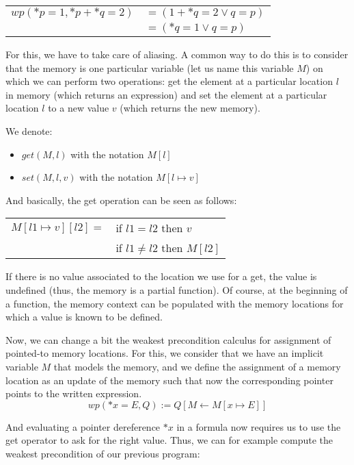 \begin{tabular}{ll}
$wp(*p = 1, *p + *q = 2)$ & $= (1 + *q = 2 \vee q = p)$\\
                          & $= (*q = 1 \vee q = p)$
\end{tabular}



For this, we have to take care of aliasing. A common way to do this is to
consider that the memory is one particular variable (let us name this variable
$M$) on which we can perform two operations: get the element at a particular
location $l$ in memory (which returns an expression) and set the element at a
particular location $l$ to a new value $v$ (which returns the new memory).


We denote:


\begin{itemize}
\item $get(M,l)$ with the notation $M[l]$
\item $set(M,l,v)$ with the notation $M[l \mapsto v]$
\end{itemize}


And basically, the get operation can be seen as follows:


\begin{tabular}{ll}
  $M[l1 \mapsto v][l2] =$ & if $l1   =  l2$ then $v$ \\
                          & if $l1 \neq l2$ then $M[l2]$
\end{tabular}


If there is no value associated to the location we use for a get, the value is
undefined (thus, the memory is a partial function). Of course, at the beginning of
a function, the memory context can be populated with the memory locations for
which a value is known to be defined.


Now, we can change a bit the weakest precondition calculus for assignment
of pointed-to memory locations. For this, we consider that we have an implicit
variable $M$ that models the memory, and we define the assignment of a memory
location as an update of the memory such that now the corresponding pointer points
to the written expression.
$$wp(*x = E, Q) := Q[M \leftarrow M[x \mapsto E]]$$


And evaluating a pointer dereference $*x$ in a formula now requires us to use the
get operator to ask for the right value. Thus, we can for example compute the weakest
precondition of our previous program:

